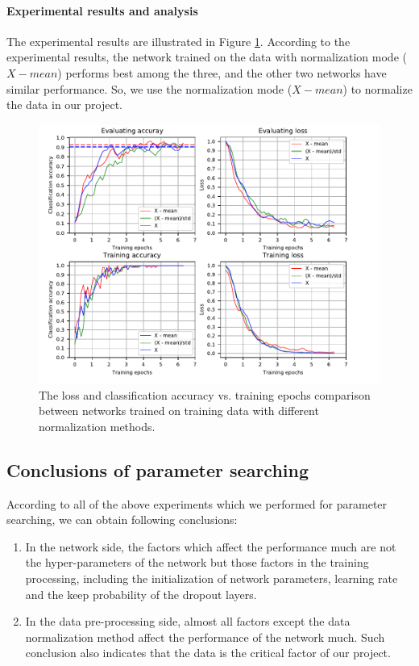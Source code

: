 \paragraph{Experimental results and analysis}
The experimental results are illustrated in Figure \ref{fig:plot_dnm}. According to the experimental results, the network trained on the data with normalization mode (\(X -mean\)) performs best among the three, and the other two networks have similar performance. So, we use the normalization mode (\(X -mean\)) to normalize the data in our project.
\begin{figure}
	\includegraphics[trim=0cm 0cm 0cm 0cm]{fig01/plot_dnm.pdf}
	\caption{The loss and classification accuracy vs. training epochs comparison between networks trained on training data with different normalization methods.}
	\label{fig:plot_dnm}
\end{figure}

\subsection{Conclusions of parameter searching}
According to all of the above experiments which we performed for parameter searching, we can obtain following conclusions:
\begin{enumerate}
	\item In the network side,  the factors which affect the performance much are not the hyper-parameters of the network but those factors in the training processing, including the initialization of network parameters, learning rate and the keep probability of the dropout layers. 
	\item In the data pre-processing side, almost all factors except the data normalization method affect the performance of the network much.  Such conclusion also indicates that the data is the critical factor of our project.   
\end{enumerate}

